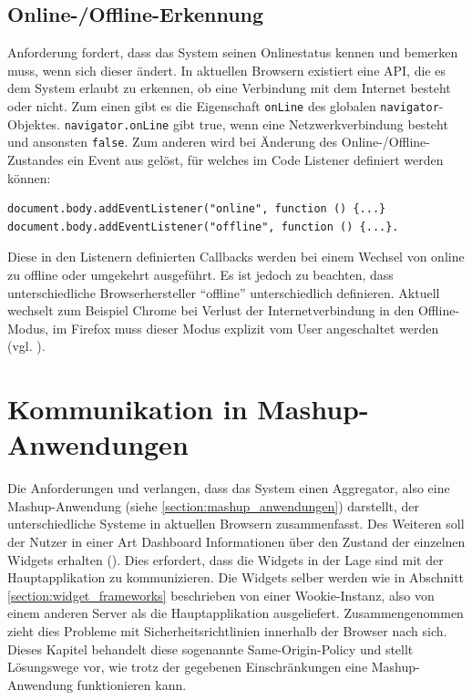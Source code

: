 \subsection{Online-/Offline-Erkennung}\label{section:online_offline_erkennung}
Anforderung  fordert, dass das System seinen Onlinestatus kennen und bemerken muss, wenn sich dieser ändert. In aktuellen Browsern existiert eine API, die es dem System erlaubt zu erkennen, ob eine Verbindung mit dem Internet besteht oder nicht. Zum einen gibt es die Eigenschaft \texttt{onLine} des globalen \texttt{navigator}-Objektes. \texttt{navigator.onLine} gibt true, wenn eine Netzwerkverbindung besteht und ansonsten \texttt{false}. Zum anderen wird bei Änderung des Online-/Offline-Zustandes ein Event aus gelöst, für welches im Code Listener definiert werden können:
\begin{lstlisting}
document.body.addEventListener("online", function () {...} 
document.body.addEventListener("offline", function () {...}.
\end{lstlisting}          
Diese in den Listenern definierten Callbacks werden bei einem Wechsel von online zu offline oder umgekehrt ausgeführt. Es ist jedoch zu beachten, dass unterschiedliche Browserhersteller "`offline"' unterschiedlich definieren. Aktuell wechselt zum Beispiel Chrome bei Verlust der Internetverbindung in den Offline-Modus, im Firefox muss dieser Modus explizit vom User angeschaltet werden (vgl. \cite{MozBug2011}).

\section{Kommunikation in Mashup-Anwendungen}\label{section:kommunikation_in_mashup_anwendungen}
Die Anforderungen  und  verlangen, dass das System einen Aggregator, also eine Mashup-Anwendung (siehe \ref{section:mashup_anwendungen}) darstellt, der unterschiedliche Systeme in aktuellen Browsern zusammenfasst. Des Weiteren soll der Nutzer in einer Art Dashboard Informationen über den Zustand der einzelnen Widgets erhalten (). Dies erfordert, dass die Widgets in der Lage sind mit der Hauptapplikation zu kommunizieren. Die Widgets selber werden wie in Abschnitt \ref{section:widget_frameworks} beschrieben von einer Wookie-Instanz, also von einem anderen Server als die Hauptapplikation ausgeliefert. Zusammengenommen zieht dies Probleme mit Sicherheitsrichtlinien innerhalb der Browser nach sich. Dieses Kapitel behandelt diese sogenannte Same-Origin-Policy und stellt Lösungswege vor, wie trotz der gegebenen Einschränkungen eine Mashup-Anwendung funktionieren kann.

